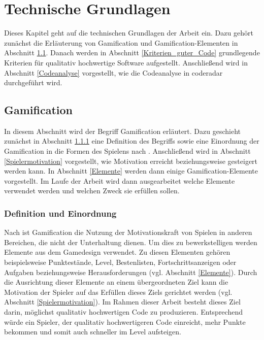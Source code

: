 \documentclass[
	oneside,  %
	ngerman, 
	final, 
	11pt, 
	a4paper, 
	1.1headlines, 
	headinclude=false, 
	footinclude=false, 
	mpinclude=false, 
	pagesize, 
	onecolumn, 
	titlepage, 
	parskip=half, 
	headsepline, 
	chapterprefix=false, 
	version=first, 
	listof=totoc, 
	bibliography=totoc, 
	toc=graduated, 
	fleqn
]{scrbook}
\begin{document}
\chapter{Technische Grundlagen}
\label{Technische_Grundlagen}
Dieses Kapitel geht auf die technischen Grundlagen der Arbeit ein.
Dazu gehört zunächst die Erläuterung von Gamification und Gamification-Elementen in Abschnitt \ref{Gamification}.
Danach werden in Abschnitt \ref{Kriterien_guter_Code} grundlegende Kriterien für qualitativ hochwertige Software aufgestellt.
Anschließend wird in Abschnitt \ref{Codeanalyse} vorgestellt, wie die Codeanalyse in coderadar durchgeführt wird.

\section{Gamification}
\label{Gamification}
In diesem Abschnitt wird der Begriff Gamification erläutert.
Dazu geschieht zunächst in Abschnitt \ref{Definition} eine Definition des Begriffs sowie eine Einordnung der Gamification in die Formen des Spielens nach \cite{DD2011}.
Anschließend wird in Abschnitt \ref{Spielermotivation} vorgestellt, wie Motivation erreicht beziehungsweise gesteigert werden kann.
In Abschnitt \ref{Elemente} werden dann einige Gamification-Elemente vorgestellt.
Im Laufe der Arbeit wird dann ausgearbeitet welche Elemente verwendet werden und welchen Zweck sie erfüllen sollen.

\subsection{Definition und Einordnung}
\label{Definition}
Nach \cite{SH2014} ist Gamification die Nutzung der Motivationskraft von Spielen in anderen Bereichen, die nicht der Unterhaltung dienen.
Um dies zu bewerkstelligen werden Elemente aus dem Gamedesign verwendet.
Zu diesen Elementen gehören beispielsweise Punktestände, Level, Bestenlisten, Fortschrittsanzeigen oder Aufgaben beziehungsweise Herausforderungen (vgl. Abschnitt \ref{Elemente}).
Durch die Ausrichtung dieser Elemente an einem übergeordneten Ziel kann die Motivation der Spieler auf das Erfüllen dieses Ziels gerichtet werden (vgl. Abschnitt \ref{Spielermotivation}).
Im Rahmen dieser Arbeit besteht dieses Ziel darin, möglichst qualitativ hochwertigen Code zu produzieren.
Entsprechend würde ein Spieler, der qualitativ hochwertigeren Code einreicht, mehr Punkte bekommen und somit auch schneller im Level aufsteigen.
\end{document}
